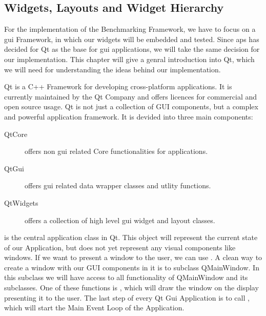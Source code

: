 
\subsection{Widgets, Layouts and Widget Hierarchy}
\label{sec:fundamentals:qt:basics}

For the implementation of the Benchmarking Framework, we have to focus on a \gls{gui} Framework, in which our widgets will be embedded and tested. Since \gls{aps} has decided for Qt as the base for \gls{gui} applications, we will take the same decision for our implementation. This chapter will give a genral introduction into Qt, which we will need for understanding the ideas behind our implementation.

Qt is a C++ Framework for developing cross-platform applications. It is currently maintained by the Qt Company and offers licences for commercial and open source usage. Qt is not just a collection of GUI components, but a complex and powerful application framework. It is devided into three main components:

\begin{description}
    \item[QtCore] offers non \gls{gui} related Core functionalities for applications.
    \item[QtGui] offers \gls{gui} related data wrapper classes and utlity functions.
    \item[QtWidgets] offers a collection of high level \gls{gui} widget and layout classes.
\end{description}

 is the central application class in Qt. This object will represent the current state of our Application, but does not yet represent any visual components like windows. If we want to present a window to the user, we can use . A clean way to create a window with our GUI components in it is to subclass QMainWindow. In this subclass we will have access to all functionality of QMainWindow and its subclasses. One of these functions is , which will draw the window on the display presenting it to the user. The last step of every Qt Gui Application is to call , which will start the Main Event Loop of the Application.

